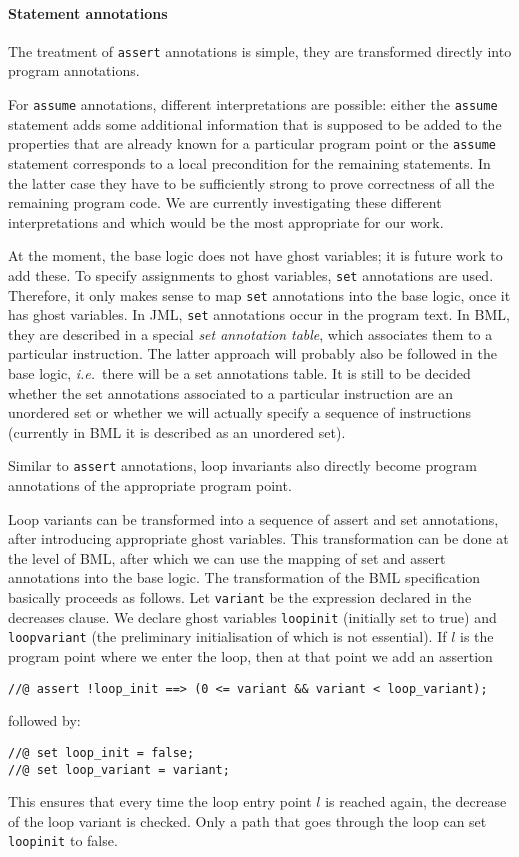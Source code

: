 \paragraph{Statement annotations}
The treatment of \texttt{assert} annotations is simple, they are
transformed directly into program annotations. 

For \texttt{assume} annotations, different interpretations are
possible: either the \texttt{assume} statement adds some additional
information that is supposed to be added to the properties that are
already known for a particular program point or the \texttt{assume}
statement corresponds to a local precondition for the remaining
statements. In the latter case they have to be sufficiently strong to
prove correctness of all the remaining program code. We are currently
investigating these different interpretations and which would be the
most appropriate for our work.

At the moment, the \mobius base logic does not have ghost
variables; it is future work to add these. To specify assignments to
ghost variables, \texttt{set} annotations are used. Therefore, it only
makes sense to map \texttt{set} annotations into the \mobius base
logic, once it has ghost variables. In JML, \texttt{set} annotations
occur in the program text. In BML, they are described in a special
\emph{set annotation table}, which associates them to a particular
instruction. The latter approach will probably also be followed in the
\mobius base logic, \emph{i.e.}\ there will be a set annotations table. It is
still to be decided whether the set annotations associated to a
particular instruction are an unordered set or whether we will
actually specify a sequence of instructions (currently in BML it is
described as an unordered set).

Similar to \texttt{assert} annotations, loop invariants also directly
become program annotations of the appropriate program point.

Loop variants can be transformed into a sequence of assert and set
annotations, after introducing appropriate ghost variables. This
transformation can be done at the level of BML, after which we can use
the mapping of set and assert annotations into the
\mobius base logic. 
The transformation of the BML specification basically proceeds as
follows.  Let \texttt{variant} be the expression declared in the
decreases clause.  We declare ghost variables \texttt{loop\unsc init}
(initially set to true) and \texttt{loop\unsc variant} (the 
preliminary initialisation of which is not essential). 
If \(l\) is the program point where we
enter the loop, then at that point we add an assertion
\begin{verbatim}
//@ assert !loop_init ==> (0 <= variant && variant < loop_variant);
\end{verbatim}
followed by:
\begin{verbatim}
//@ set loop_init = false;
//@ set loop_variant = variant;
\end{verbatim}
This ensures that every time the loop entry point \(l\) is reached
again, the decrease of the loop variant is checked. Only a path that
goes through the loop can set \texttt{loop\unsc init} to false.

